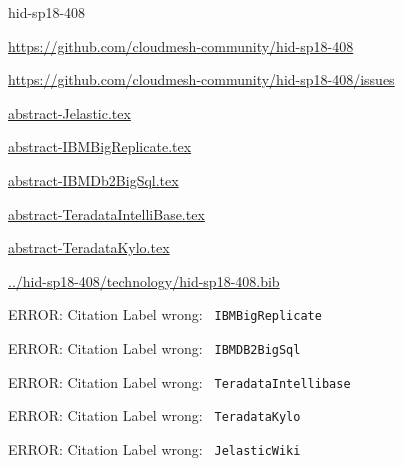 \begin{IU}

hid-sp18-408

\url{https://github.com/cloudmesh-community/hid-sp18-408}

\url{https://github.com/cloudmesh-community/hid-sp18-408/issues}

\href{https://github.com/cloudmesh-community/hid-sp18-408/blob/master//technology/abstract-Jelastic.tex}{abstract-Jelastic.tex}

\href{https://github.com/cloudmesh-community/hid-sp18-408/blob/master//technology/abstract-IBMBigReplicate.tex}{abstract-IBMBigReplicate.tex}

\href{https://github.com/cloudmesh-community/hid-sp18-408/blob/master//technology/abstract-IBMDb2BigSql.tex}{abstract-IBMDb2BigSql.tex}

\href{https://github.com/cloudmesh-community/hid-sp18-408/blob/master//technology/abstract-TeradataIntelliBase.tex}{abstract-TeradataIntelliBase.tex}

\href{https://github.com/cloudmesh-community/hid-sp18-408/blob/master//technology/abstract-TeradataKylo.tex}{abstract-TeradataKylo.tex}

\href{https://github.com/cloudmesh-community/hid-sp18-408/blob/master//technology/hid-sp18-408.bib}{../hid-sp18-408/technology/hid-sp18-408.bib}

 ERROR: Citation Label wrong: \verb| IBMBigReplicate |

 ERROR: Citation Label wrong: \verb| IBMDB2BigSql |

 ERROR: Citation Label wrong: \verb| TeradataIntellibase |

 ERROR: Citation Label wrong: \verb| TeradataKylo |

 ERROR: Citation Label wrong: \verb| JelasticWiki |

\end{IU}


